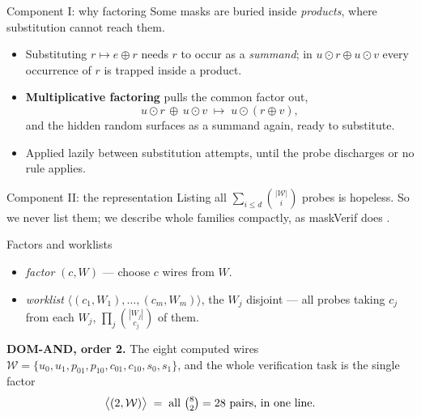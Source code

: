 \documentclass[aspectratio=169,10pt]{beamer}
\newcommand{\Ws}{\mathcal{W}}
\begin{document}
\begin{frame}{Component I: why factoring}
  Some masks are buried inside \emph{products}, where substitution cannot
  reach them.
  \medskip
  \begin{itemize}
    \item<1-> Substituting $r \mapsto e \oplus r$ needs $r$ to occur as a
      \emph{summand}; in $u \odot r \oplus u \odot v$ every occurrence of $r$
      is trapped inside a product.
    \item<2-> \textbf{Multiplicative factoring} pulls the common factor out,
      \[
        u \odot r \,\oplus\, u \odot v \;\longmapsto\; u \odot (r \oplus v) ,
      \]
      and the hidden random surfaces as a summand again, ready to substitute.
    \item<3-> Applied lazily between substitution attempts, until the probe
      discharges or no rule applies.
  \end{itemize}
\end{frame}

\begin{frame}{Component II: the representation}
  Listing all $\sum_{i \le d} \binom{|\Ws|}{i}$ probes is hopeless. So we never
  list them; we describe whole families compactly, as maskVerif does
  \parencite{10.1007/978-3-030-29959-0_15}.
  \medskip
  \begin{block}{Factors and worklists}
    \begin{itemize}
      \item \emph{factor} $(c, W)$ --- choose $c$ wires from $W$.
      \item \emph{worklist} $\langle (c_1, W_1), \dots, (c_m, W_m) \rangle$,
        the $W_j$ disjoint --- all probes taking $c_j$ from each $W_j$,
        $\prod_j \binom{|W_j|}{c_j}$ of them.
    \end{itemize}
  \end{block}
  \medskip
  \textbf{DOM-AND, order 2.} The eight computed wires
  $\Ws = \{u_0, u_1, p_{01}, p_{10}, c_{01}, c_{10}, s_0, s_1\}$, and the whole
  verification task is the single factor
  \[
    \bigl\langle (2, \Ws) \bigr\rangle
    \;=\; \text{all } \tbinom{8}{2} = 28 \text{ pairs, in one line.}
  \]
\end{frame}
\end{document}
